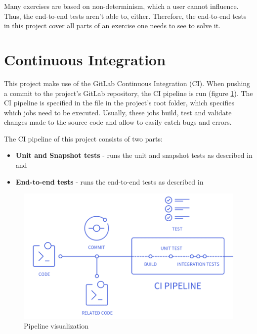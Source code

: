 Many exercises are based on non-determinism, which a user cannot influence. Thus, the end-to-end tests aren't able to, either. Therefore, the end-to-end tests in this project cover all parts of an exercise one needs to see to solve it. 

\section{Continuous Integration}
\label{section:CI}

This project make use of the GitLab Continuous Integration (CI). When pushing a commit to the project's GitLab repository, the CI pipeline is run (figure \ref{fig:pipeline}). The CI pipeline is specified in the  file in the project's root folder, which specifies which jobs need to be executed. Usually, these jobs build, test and validate changes made to the source code and allow to easily catch bugs and errors.

The CI pipeline of this project consists of two parts:

\begin{itemize}
    \item \textbf{Unit and Snapshot tests} - runs the unit and snapshot tests as described in  and 
    \item \textbf{End-to-end tests} - runs the end-to-end tests as described in 
\end{itemize}

\begin{figure} 
    \centering
    \includegraphics[width=0.6 \columnwidth]{figures/pipeline.png}
    \caption{Pipeline visualization \cite{CIPipeline}} 
    \label{fig:pipeline} 
\end{figure}